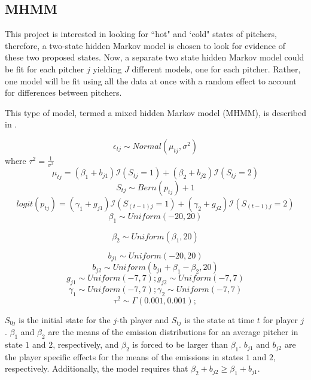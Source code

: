 \documentclass[letterpaper,12pt]{article}\usepackage[]{graphicx}\usepackage[]{color}
\begin{document}
\subsection{MHMM}
This project is interested in looking for ``hot" and `cold" states of pitchers, therefore, a two-state hidden Markov model is chosen to look for evidence of these two proposed states.  Now, a separate two state hidden Markov model could be fit for each pitcher $j$ yielding $J$ different models, one for each pitcher.  Rather, one model will be fit using all the data at once with a random effect to account for differences between pitchers. 



This type of model, termed a mixed hidden Markov model (MHMM), is described in \cite{Altman2007}. 






$$
\epsilon_{tj} \sim Normal(\mu_{tj},\sigma^2) 
$$
where $\tau^2=\frac{1}{\sigma^2}$
$$
\mu_{tj} = (\beta_1 + b_{j1})\mathcal{I}(S_{tj}=1) + (\beta_2 + b_{j2})\mathcal{I}(S_{tj}=2) 
$$
$$
S_{tj} \sim Bern(p_{tj}) + 1
$$
$$
logit(p_{tj}) =(\gamma_1 + g_{j1})\mathcal{I}(S_{(t-1)j}=1) + (\gamma_2 + g_{j2})\mathcal{I}(S_{(t-1)j}=2)
$$
$$
\beta_{1} \sim Uniform(-20,20)
$$

$$
\beta_{2} \sim Uniform(\beta_1,20) 
$$

$$
b_{j1} \sim Uniform(-20,20)
$$
$$
b_{j2} \sim Uniform(b_{j1}+\beta_1-\beta_2,20) 
$$
$$
g_{j1} \sim Uniform(-7,7);g_{j2} \sim Uniform(-7,7)
$$
$$
\gamma_1 \sim Uniform(-7,7);
\gamma_2 \sim Uniform(-7,7)
$$
$$
\tau^2 \sim \Gamma(0.001,0.001);
$$



$S_{0j}$ is the initial state for the $j$-th player and $S_{tj}$ is the state at time $t$ for player $j$.  $\beta_1$  and $\beta_2$ are the means of the emission distributions for an average pitcher in state $1$ and $2$, respectively, and $\beta_2$ is forced to be larger than $\beta_1$.  $b_{j1}$ and $b_{j2}$ are the player specific effects for the means of the emissions in states $1$ and $2$, respectively.  Additionally, the model requires that $\beta_2 + b_{j2} \ge \beta_1 + b_{j1}$.  
\end{document}
